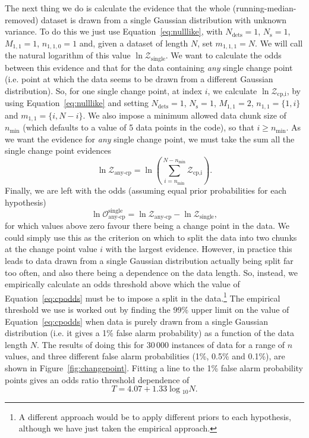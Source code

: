 The next thing we do is calculate the evidence that the whole (running-median-removed) dataset is drawn from a single
Gaussian distribution with unknown variance. To do this we just use Equation~\ref{eq:nulllike}, with $N_{\text{dets}} =1$,
$N_{\text{s}}=1$, $M_{1,1}=1$, $n_{1,1,0}=1$ and, given a dataset of length $N$, set $m_{1,1,1}=N$. We will call the natural logarithm
of this value $\ln{\mathcal{Z}_{\text{single}}}$. We want to calculate the odds between this evidence and that for the data containing
{\it any} single change point (i.e. point at which the data seems to be drawn from a different Gaussian distribution). So, for
one single change point, at index $i$, we calculate $\ln{\mathcal{Z}_{\text{cp,i}}}$, by using Equation~\ref{eq:nulllike} and setting
$N_{\text{dets}} =1$, $N_{\text{s}}=1$, $M_{1,1}=2$, $n_{1,1}=\{1,i\}$ and $m_{1,1} = \{i,N-i\}$. We also impose a minimum allowed data
chunk size of $n_{\text{min}}$ (which defaults to a value of 5 data points in the code), so that $i \geqslant n_{\text{min}}$. As we want
the evidence for {\it any} single change point, we must take the sum all the single change point evidences
\begin{equation}
 \ln{\mathcal{Z}_{\text{any-cp}}} = \ln{\left(\sum_{i=n_{\text{min}}}^{N-n_{\text{min}}} \mathcal{Z}_{\text{cp,i}} \right)}.
\end{equation}
Finally, we are left with the odds (assuming equal prior probabilities for each hypothesis)
\begin{equation}\label{eq:cpodds}
 \ln{\mathcal{O}_{\text{any-cp}}^{\text{single}}} = \ln{\mathcal{Z}_{\text{any-cp}}} - \ln{\mathcal{Z}_{\text{single}}},
\end{equation}
for which values above zero favour there being a change point in the data. We could simply use this as the criterion on which to
split the data into two chunks at the change point value $i$ with the largest evidence. However, in practice this leads to
data drawn from a single Gaussian distribution actually being split far too often, and also there being a dependence on the
data length. So, instead, we empirically calculate an odds threshold above which the value of Equation~\ref{eq:cpodds} must be to
impose a split in the data.\footnote{A different approach would be to apply different priors to each hypothesis, although we have just taken
the empirical approach.} The empirical threshold we use is worked out by finding the 99\% upper limit on the value of
Equation~\ref{eq:cpodds} when data is purely drawn from a single Gaussian distribution (i.e. it gives a 1\% false alarm probability)
as a function of the data length $N$. The results of doing this for 30\,000 instances of data for a range of $n$ values, and three
different false alarm probabilities (1\%, 0.5\% and 0.1\%), are shown in Figure~\ref{fig:changepoint}. Fitting a line to the 1\% false alarm
probability points gives an odds ratio threshold dependence of
\begin{equation}
 T = 4.07 + 1.33\log{}_{10}{N}.
\end{equation}

